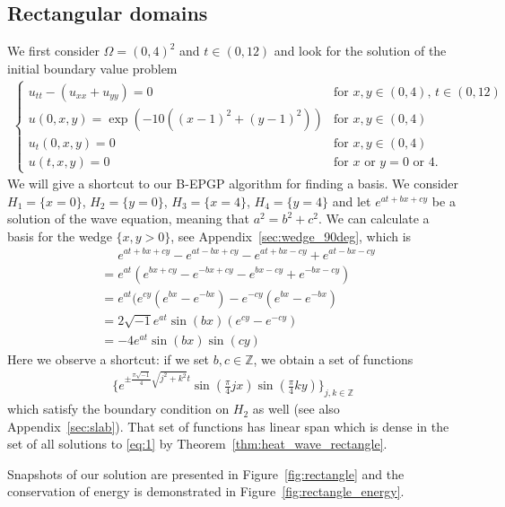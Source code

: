 \documentclass{article} %
\theoremstyle{plain}
\theoremstyle{definition}
\theoremstyle{remark}
\newcommand{\p}{\partial}
\begin{document}
\subsection{Rectangular domains}\label{sec:rectangle}
We first consider \(\Omega=(0,4)^2\) and $t\in(0,12)$ and look for the solution of the initial boundary value problem
\begin{align*}
    \begin{cases}
        u_{tt}- (u_{xx}+u_{yy})=0&\text{for }x,y\in(0,4),\,t\in(0,12)\\
        u(0,x,y)= \exp (-10((x-1)^2+(y-1)^2))&\text{for }x,y\in(0,4)\\
        u_t(0,x,y) = 0&\text{for }x,y\in(0,4)\\
        u(t,x,y) = 0 &\text{for $x$ or $y=0$ or $4$.}
    \end{cases}
\end{align*}
We will give a shortcut to our B-EPGP algorithm for finding a basis. We consider $H_1=\{x=0\}$, $H_2=\{y=0\}$, $H_3=\{x=4\}$, $H_4=\{y=4\}$ and let $e^{at+bx+cy}$ be a solution of the wave equation, meaning that $a^2=b^2+c^2$. We can calculate a basis for the wedge $\{x,y>0\}$, see Appendix~\ref{sec:wedge_90deg}, which is
\begin{align*}
&\phantom{=}e^{at+bx+cy}-e^{at-bx+cy}-e^{at+bx-cy}+e^{at-bx-cy}\\
&=e^{at}(e^{bx+cy}-e^{-bx+cy}-e^{bx-cy}+e^{-bx-cy})\\
&=e^{at}(e^{cy}(e^{bx}-e^{-bx})-e^{-cy}(e^{bx}-e^{-bx})\\
&=2\sqrt{-1}e^{at}\sin(bx)(e^{cy}-e^{-cy})\\
&=-4e^{at}\sin(bx)\sin(cy)
\end{align*}
Here we observe a shortcut: if we set $b,c\in \mathbb Z$, we obtain a set of functions
\begin{align*}
    \{e^{\pm \tfrac{\pi\sqrt{-1}}{4}\sqrt{j^2+k^2}t}\sin(\tfrac\pi4 jx)\sin(\tfrac\pi4 ky)\}_{j,k\in\mathbb Z}
\end{align*}
which satisfy the boundary condition on $H_2$ as well (see also Appendix~\ref{sec:slab}). That set of functions has linear span which is dense in the set of all solutions to \eqref{eq:1} by Theorem~\ref{thm:heat_wave_rectangle}.

Snapshots of our solution are presented in Figure~\ref{fig:rectangle} and the conservation of energy is demonstrated in Figure~\ref{fig:rectangle_energy}.
\end{document}
